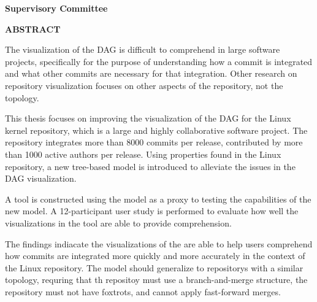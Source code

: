 \newpage
{}

\noindent \textbf{Supervisory Committee}
\tpbreak
\panel

\begin{center}
  \textbf{ABSTRACT}

  The visualization of the DAG is difficult to comprehend in large
  software projects, specifically for the purpose of understanding how a
  commit is integrated and what other commits are necessary for that
  integration. Other research on repository visualization focuses on
  other aspects of the repository, not the topology.

  This thesis focuses on improving the visualization of the DAG for the
  Linux kernel repository, which is a large and highly collaborative
  software project. The repository integrates more than 8000 commits per
  release, contributed by more than 1000 active authors per release.
  Using properties found in the Linux repository, a new tree-based model
  is introduced to alleviate the issues in the DAG visualization.

  A tool is constructed using the \mt{} model as a proxy to testing the
  capabilities of the new model. A 12-participant user study is
  performed to evaluate how well the visualizations in the tool are able
  to provide comprehension.

  The findings indiacate the visualizations of the \mt{} are able to
  help users comprehend how commits are integrated more quickly and more
  accurately in the context of the Linux repository. The model should
  generalize to repositorys with a similar topology, requring that th
  repositoy must use a branch-and-merge structure, the repository must
  not have foxtrots, and cannot apply fast-forward merges.

\end{center}
